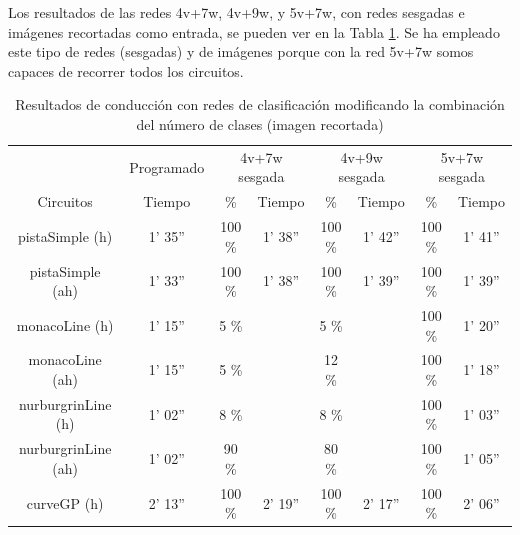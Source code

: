 Los resultados de las redes 4v+7w, 4v+9w, y 5v+7w, con redes sesgadas e imágenes recortadas como entrada, se pueden ver en la Tabla \ref{resultados_classificacion_recortada}. Se ha empleado este tipo de redes (sesgadas) y de imágenes porque con la red 5v+7w somos capaces de recorrer todos los circuitos.\\


\begin{table}[H]
\centering
\caption{Resultados de conducción con redes de clasificación modificando la combinación del número de clases (imagen recortada)}
\label{resultados_classificacion_recortada}
\begin{tabular}{c|c|c|c|c|c|c|c|}
\cline{2-8}
                          & \multicolumn{1}{c|}{Programado} & \multicolumn{2}{c|}{4v+7w sesgada} & \multicolumn{2}{c|}{4v+9w sesgada} & \multicolumn{2}{c|}{5v+7w sesgada} \\ \cline{1-8} 
                        \multicolumn{1}{|c|}{Circuitos}    & Tiempo       & \%       & Tiempo       & \%        & Tiempo       & \%      & Tiempo     \\ \hline
\multicolumn{1}{|c|}{pistaSimple (h)}    & 1' 35''           & 100 \%         & 1' 38''           & 100 \%          & 1' 42''           & 100 \%       & 1' 41''      \\ \hline
\multicolumn{1}{|c|}{pistaSimple (ah)}     & 1' 33''           & 100 \%          & 1' 38''            & 100 \%           & 1' 39''           & 100 \%       & 1' 39''       \\ \hline
\multicolumn{1}{|c|}{monacoLine (h)}      & 1' 15''           & 5 \%           &             & 5 \%       &             & 100 \%       & 1' 20''         \\ \hline
\multicolumn{1}{|c|}{monacoLine (ah)}       & 1' 15''            & 5 \%       &             & 12 \%           &             & 100 \%          & 1' 18''      \\ \hline
\multicolumn{1}{|c|}{nurburgrinLine (h)}      & 1' 02''            & 8 \%          &            & 8 \%        &           & 100 \%       &  1' 03''    \\ \hline
\multicolumn{1}{|c|}{nurburgrinLine (ah)}       & 1' 02''           & 90 \%           &           & 80 \%        &            & 100 \%       & 1' 05''       \\ \hline
\multicolumn{1}{|c|}{curveGP (h)}     & 2' 13''           & 100 \%           & 2' 19''            & 100 \%        & 2' 17''           & 100 \%       & 2' 06''      \\ \hline

\end{tabular}
\end{table}
